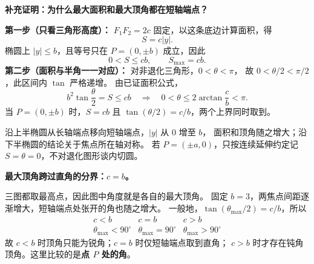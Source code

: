 \begin{proofbox}
\textbf{补充证明：为什么最大面积和最大顶角都在短轴端点？}

\textbf{第一步（只看三角形高度）：}
$F_1F_2=2c$ 固定，以这条底边计算面积，得
\[
 S=c|y|.
\]
椭圆上 $|y|\le b$，且等号只在 $P=(0,\pm b)$ 成立，因此
\[
 \boxed{0<S\le cb},\qquad S_{\max}=cb.
\]
\textbf{第二步（面积与半角一一对应）：}
对非退化三角形，$0<\theta<\pi$，
故 $0<\theta/2<\pi/2$，此区间内 $\tan$ 严格递增。
由已证面积公式，
\[
 b^2\tan\frac\theta2=S\le cb
 \quad\Longrightarrow\quad
 \boxed{0<\theta\le2\arctan\frac cb<\pi}.
\]
当 $P=(0,\pm b)$ 时，$S=cb$ 且 $\tan(\theta/2)=c/b$，两个上界同时取到。

沿上半椭圆从长轴端点移向短轴端点，$|y|$ 从 $0$ 增至 $b$，
面积和顶角随之增大；沿下半椭圆的结论关于焦点所在轴对称。
若 $P=(\pm a,0)$，只按连续延伸约定记 $S=\theta=0$，不对退化图形谈内切圆。

\medskip
\end{proofbox}
\clearpage
\begin{proofbox}
\textbf{最大顶角跨过直角的分界：$c=b$。}

三图都取最高点，因此图中角度就是各自的最大顶角。
固定 $b=3$，两焦点间距逐渐增大，短轴端点处张开的角也随之增大。
一般地，$\tan(\theta_{\max}/2)=c/b$，所以
\[
\begin{array}{c|c|c}
 c<b & c=b & c>b\\ \hline
 \theta_{\max}<90^\circ & \theta_{\max}=90^\circ & \theta_{\max}>90^\circ
\end{array}
\]
故 $c<b$ 时顶角只能为锐角；$c=b$ 时仅短轴端点取到直角；
$c>b$ 时才存在钝角顶角。这里比较的是\textbf{点 $P$ 处的角}。
\end{proofbox}
\clearpage
